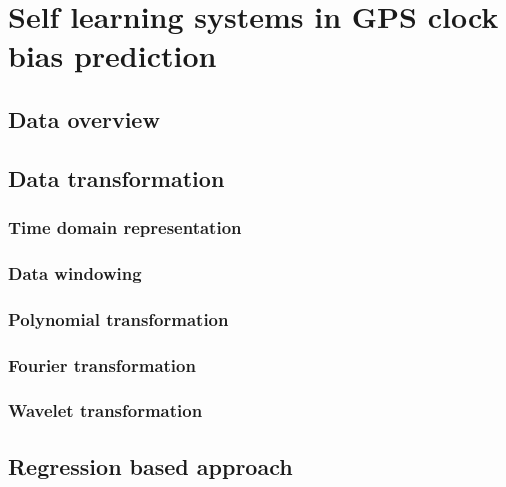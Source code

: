 \chapter{Self learning systems in GPS clock bias prediction}



\section{Data overview}

\section{Data transformation}

\subsection{Time domain representation}
\subsection{Data windowing}
\subsection{Polynomial transformation}
\subsection{Fourier transformation}
\subsection{Wavelet transformation}

\section{Regression based approach}


